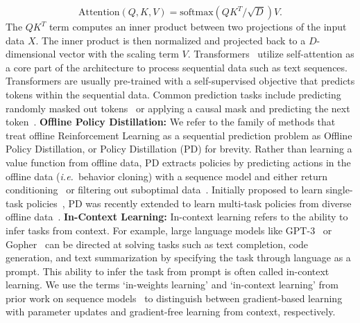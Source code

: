 \documentclass{article}
\theoremstyle{thm}
\newcommand{\ie}{{\it i.e.}}
\begin{document}
\begin{equation}
    \text{Attention}(Q,K,V) = \text{softmax} (Q K^T / \sqrt{D}) V.
\end{equation}
The $QK^T$ term computes an inner product between two projections of the input data $X$. The inner product is then normalized and projected back to a $D$-dimensional vector with the scaling term $V$. Transformers~\citep{vaswani2017attention, devlin2018bert, brown2020gpt3} utilize self-attention as a core part of the architecture to process sequential data such as text sequences. Transformers are usually pre-trained with a self-supervised objective that predicts tokens within the sequential data. Common prediction tasks include predicting randomly masked out tokens~\citep{devlin2018bert} or applying a causal mask and predicting the next token~\citep{radford2018improving}.
{\bf Offline Policy Distillation:} We refer to the family of methods that treat offline Reinforcement Learning as a sequential prediction problem as Offline Policy Distillation, or Policy Distillation (PD) for brevity. Rather than learning a value function from offline data, PD extracts policies by predicting actions in the offline data (\ie\, behavior cloning) with a sequence model and either return conditioning~\citep{chen2021dt, lee2022mgdt} or filtering out suboptimal data~\citep{reed2022gato}. Initially proposed to learn single-task policies~\citep{chen2021dt, janner2021tto}, PD was recently extended to learn multi-task policies from diverse offline data~\citep{lee2022mgdt, reed2022gato}.
{\bf In-Context Learning:} In-context learning refers to the ability to infer tasks from context. For example, large language models like GPT-3~\citep{brown2020gpt3} or Gopher~\citep{rae2012gopher} can be directed at solving tasks such as text completion, code generation, and text summarization by specifying the task through language as a prompt. This ability to infer the task from prompt is often called in-context learning. We use the terms `in-weights learning' and `in-context learning' from prior work on sequence models~\citep{brown2020gpt3,chan2022data} to distinguish between gradient-based learning with parameter updates and gradient-free learning from context, respectively.
\end{document}
